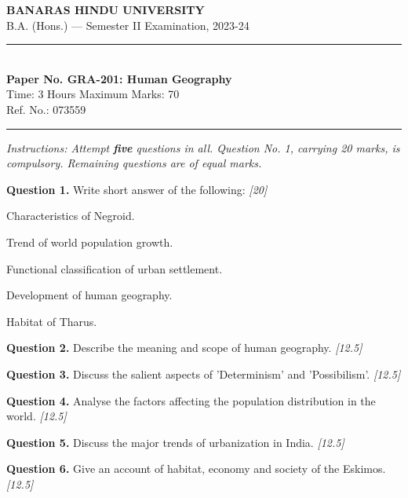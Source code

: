 \documentclass[11pt,a4paper]{article}
\newcommand{\pts}[1]{\hfill   \textit{[#1]}}
\begin{document}
\begin{center}
  {\large\bfseries BANARAS HINDU UNIVERSITY}\\[2pt]
  {\normalsize B.A. (Hons.) --- Semester II Examination, 2023-24}\\[6pt]
  \rule{0.8\linewidth}{0.5pt}\\[6pt]
  {\large\bfseries Paper No. GRA-201: Human Geography}\\[4pt]
  {\normalsize Time: 3 Hours \hfill Maximum Marks: 70}\\[2pt]
  {\small Ref. No.: 073559}
\end{center}
\rule{\linewidth}{0.4pt}
\smallskip



\noindent   \textit{Instructions: Attempt   \textbf{five} questions in all. Question No. 1, carrying 20 marks, is compulsory. Remaining questions are of equal marks.}
\bigskip




\noindent   \textbf{Question 1.} Write short answer of the following: \pts{20}

\begin{parts}
  \item Characteristics of Negroid.
  \item Trend of world population growth.
  \item Functional classification of urban settlement.
  \item Development of human geography.
  \item Habitat of Tharus.
\end{parts}

\medskip


\noindent   \textbf{Question 2.} Describe the meaning and scope of human geography. \pts{12.5}

\medskip


\noindent   \textbf{Question 3.} Discuss the salient aspects of 'Determinism' and 'Possibilism'. \pts{12.5}

\medskip


\noindent   \textbf{Question 4.} Analyse the factors affecting the population distribution in the world. \pts{12.5}

\medskip


\noindent   \textbf{Question 5.} Discuss the major trends of urbanization in India. \pts{12.5}

\medskip


\noindent   \textbf{Question 6.} Give an account of habitat, economy and society of the Eskimos. \pts{12.5}
\end{document}
